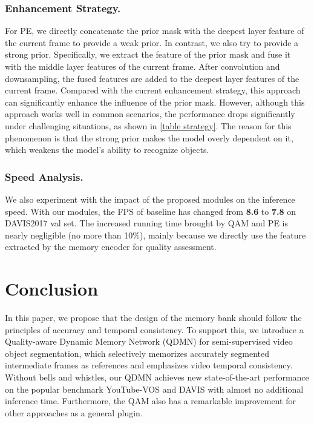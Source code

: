 \documentclass[runningheads]{llncs}
\begin{document}
         \subsubsection{Enhancement Strategy.} 
    For PE, we directly concatenate the prior mask with the deepest layer feature of the current frame to provide a weak prior. In contrast, we also try to provide a strong prior. Specifically,  we extract the feature of the prior mask and fuse it with the middle layer features of the current frame. After convolution and downsampling, the fused features are added to the deepest layer features of the current frame. Compared with the current enhancement strategy, this approach can significantly enhance the influence of the prior mask. However, although this approach works well in common scenarios, the performance drops significantly under challenging situations, as shown in \cref{table strategy}.
    The reason for this phenomenon is that the strong prior makes the model overly dependent on it, which weakens the model's ability to recognize objects.
    

    
    \subsubsection{Speed Analysis.} We also experiment with the impact of the proposed modules on the inference speed. With our modules, the FPS of baseline has changed from \textbf{8.6} to \textbf{7.8} on DAVIS2017 val set. 
    The increased running time brought by QAM and PE is nearly negligible (no more than 10$\%$), mainly because we directly use the feature extracted by the memory encoder for quality assessment. 
\section{Conclusion}
    In this paper, we propose that the design of the memory bank should follow the principles of accuracy and temporal consistency.
    To support this, we introduce a Quality-aware Dynamic Memory Network (QDMN) for semi-supervised video object segmentation, which selectively memorizes accurately segmented intermediate frames as references and emphasizes video temporal consistency.
    Without bells and whistles, our QDMN achieves new state-of-the-art performance on the popular benchmark YouTube-VOS and DAVIS with almost no additional inference time. Furthermore, the QAM also has a remarkable improvement for other approaches as a general plugin. 
     
\end{document}
